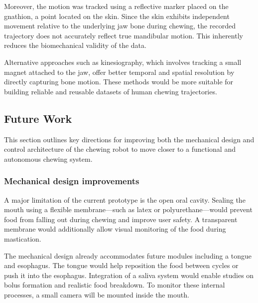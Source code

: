 Moreover, the motion was tracked using a reflective marker placed on the gnathion, a point located on the skin. Since the skin exhibits independent movement relative to 
the underlying jaw bone during chewing, the recorded trajectory does not accurately reflect true mandibular motion. This inherently reduces the biomechanical validity of the data.

Alternative approaches such as kinesiography, which involves tracking a small magnet attached to the jaw, offer better temporal and spatial resolution by directly capturing 
bone motion. These methods would be more suitable for building reliable and reusable datasets of human chewing trajectories.

\subsection{Future Work}

This section outlines key directions for improving both the mechanical design and control architecture of the chewing robot to move closer to a functional and autonomous chewing system.

\subsubsection{Mechanical design improvements}

A major limitation of the current prototype is the open oral cavity. Sealing the mouth using a flexible membrane—such as latex or polyurethane—would prevent food from falling out 
during chewing and improve user safety. A transparent membrane would additionally allow visual monitoring of the food during mastication.

The mechanical design already accommodates future modules including a tongue and esophagus. The tongue would help reposition the food between cycles or push it into the esophagus. 
Integration of a saliva system would enable studies on bolus formation and realistic food breakdown. To monitor these internal processes, a small camera will be mounted inside the mouth.

